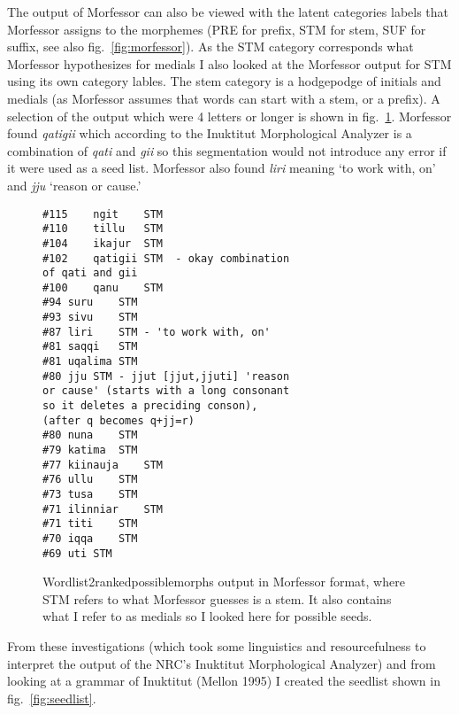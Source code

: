 \documentclass[runningheads,a4paper]{llncs}
\begin{document}
The output of Morfessor can also be viewed with the latent categories labels that Morfessor assigns to the morphemes (PRE for prefix, STM for stem, SUF for suffix, see also fig.~\ref{fig:morfessor}). As the STM category corresponds what Morfessor hypothesizes for medials I also looked at the Morfessor output for STM using its own category lables. The stem category is a hodgepodge of initials and medials (as Morfessor assumes that words can start with a stem, or a prefix). A selection of the output which were 4 letters or longer is shown in fig.~\ref{fig:morfessorstems}. Morfessor found \textit{qatigii} which according to the Inuktitut Morphological Analyzer is a combination of \textit{qati} and \textit{gii} so this segmentation would not introduce any error if it were used as a seed list. Morfessor also found \textit{liri} meaning `to work with, on' and \textit{jju}  `reason or cause.' 

\begin{figure}
\begin{verbatim}
#115	ngit	STM
#110	tillu	STM
#104	ikajur	STM
#102	qatigii	STM  - okay combination 
of qati and gii
#100	qanu	STM
#94	suru	STM
#93	sivu	STM
#87	liri	STM - 'to work with, on'
#81	saqqi	STM 
#81	uqalima	STM
#80	jju	STM - jjut [jjut,jjuti] 'reason 
or cause' (starts with a long consonant 
so it deletes a preciding conson), 
(after q becomes q+jj=r)
#80	nuna	STM
#79	katima	STM
#77	kiinauja	STM
#76	ullu	STM
#73	tusa	STM
#71	ilinniar	STM
#71	titi	STM
#70	iqqa	STM
#69	uti	STM
\end{verbatim}
	\caption{Wordlist2rankedpossiblemorphs output in Morfessor format, where STM refers to what Morfessor guesses is a stem. It also contains what I refer to as medials so I looked here for possible seeds.}
	\label{fig:morfessorstems}
\end{figure}

From these investigations (which took some linguistics and resourcefulness to interpret the output of the NRC's Inuktitut Morphological Analyzer) and from looking at a grammar of Inuktitut (Mellon 1995) I created the seedlist shown in fig.~\ref{fig:seedlist}. 
\end{document}
